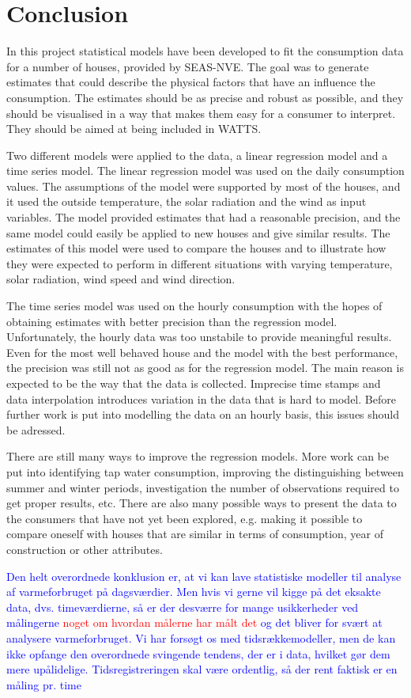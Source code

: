 \chapter{Conclusion}
In this project statistical models have been developed to fit the consumption data for a number of houses, provided by SEAS-NVE. The goal was to generate estimates that could describe the physical factors that have an influence the consumption. The estimates should be as precise and robust as possible, and they should be visualised in a way that makes them easy for a consumer to interpret. They should be aimed at being included in WATTS.

\noindent Two different models were applied to the data, a linear regression model and a time series model. The linear regression model was used on the daily consumption values. The assumptions of the model were supported by most of the houses, and it used the outside temperature, the solar radiation and the wind as input variables. The model provided estimates that had a reasonable precision, and the same model could easily be applied to new houses and give similar results. The estimates of this model were used to compare the houses and to illustrate how they were expected to perform in different situations with varying temperature, solar radiation, wind speed and wind direction.

\noindent The time series model was used on the hourly consumption with the hopes of obtaining estimates with better precision than the regression model. Unfortunately, the hourly data was too unstabile to provide meaningful results. Even for the most well behaved house and the model with the best performance, the precision was still not as good as for the regression model. The main reason is expected to be the way that the data is collected. Imprecise time stamps and data interpolation introduces variation in the data that is hard to model. Before further work is put into modelling the data on an hourly basis, this issues should be adressed.

\noindent There are still many ways to improve the regression models. More work can be put into identifying tap water consumption, improving the distinguishing between summer and winter periods, investigation the number of observations required to get proper results, etc. There are also many possible ways to present the data to the consumers that have not yet been explored, e.g. making it possible to compare oneself with houses that are similar in terms of consumption, year of construction or other attributes.

\textcolor{blue}{Den helt overordnede konklusion er, at vi kan lave statistiske modeller til analyse af varmeforbruget på dagsværdier. Men hvis vi gerne vil kigge på det eksakte data, dvs. timeværdierne, så er der desværre for mange usikkerheder ved målingerne \textcolor{red}{noget om hvordan målerne har målt det} og det bliver for svært at analysere varmeforbruget. Vi har forsøgt os med tidsrækkemodeller, men de kan ikke opfange den overordnede svingende tendens, der er i data, hvilket gør dem mere upålidelige. Tidsregistreringen skal være ordentlig, så der rent faktisk er en måling pr. time}
